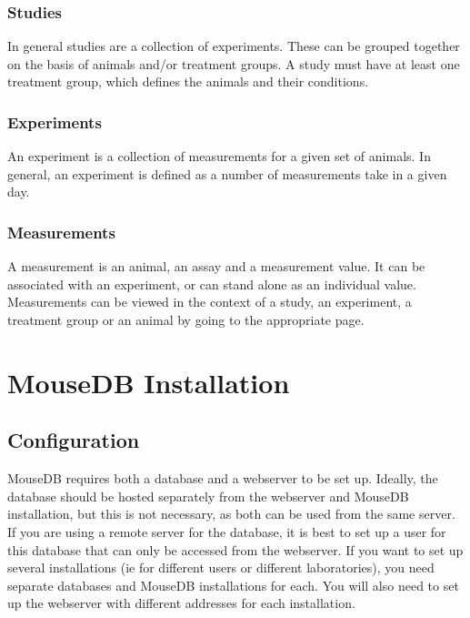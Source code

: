 \documentclass[letterpaper,10pt,english]{sphinxmanual}
\begin{document}
\subsection{Studies}

In general studies are a collection of experiments.  These can be grouped together on the basis of animals and/or treatment groups.  A study must have at least one treatment group, which defines the animals and their conditions.


\subsection{Experiments}

An experiment is a collection of measurements for a given set of animals.  In general, an experiment is defined as a number of measurements take in a given day.


\subsection{Measurements}

A measurement is an animal, an assay and a measurement value.  It can be associated with an experiment, or can stand alone as an individual value.  Measurements can be viewed in the context of a study, an experiment, a treatment group or an animal by going to the appropriate page.

\resetcurrentobjects
\hypertarget{--doc-installation}{}

\chapter{MouseDB Installation}


\section{Configuration}

MouseDB requires both a database and a webserver to be set up.  Ideally, the database should be hosted separately from the webserver and MouseDB installation, but this is not necessary, as both can be used from the same server.  If you are using a remote server for the database, it is best to set up a user for this database that can only be accessed from the webserver.  If you want to set up several installations (ie for different users or different laboratories), you need separate databases and MouseDB installations for each.  You will also need to set up the webserver with different addresses for each installation.
\end{document}
